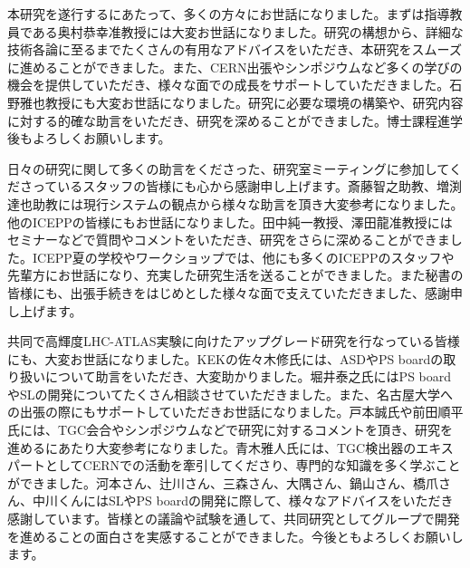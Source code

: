

本研究を遂行するにあたって、多くの方々にお世話になりました。まずは指導教員である奥村恭幸准教授には大変お世話になりました。研究の構想から、詳細な技術各論に至るまでたくさんの有用なアドバイスをいただき、本研究をスムーズに進めることができました。また、CERN出張やシンポジウムなど多くの学びの機会を提供していただき、様々な面での成長をサポートしていただきました。石野雅也教授にも大変お世話になりました。研究に必要な環境の構築や、研究内容に対する的確な助言をいただき、研究を深めることができました。博士課程進学後もよろしくお願いします。

日々の研究に関して多くの助言をくださった、研究室ミーティングに参加してくださっているスタッフの皆様にも心から感謝申し上げます。斎藤智之助教、増渕達也助教には現行システムの観点から様々な助言を頂き大変参考になりました。他のICEPPの皆様にもお世話になりました。田中純一教授、澤田龍准教授にはセミナーなどで質問やコメントをいただき、研究をさらに深めることができました。ICEPP夏の学校やワークショップでは、他にも多くのICEPPのスタッフや先輩方にお世話になり、充実した研究生活を送ることができました。また秘書の皆様にも、出張手続きをはじめとした様々な面で支えていただきました、感謝申し上げます。

共同で高輝度LHC-ATLAS実験に向けたアップグレード研究を行なっている皆様にも、大変お世話になりました。KEKの佐々木修氏には、ASDやPS boardの取り扱いについて助言をいただき、大変助かりました。堀井泰之氏にはPS boardやSLの開発についてたくさん相談させていただきました。また、名古屋大学への出張の際にもサポートしていただきお世話になりました。戸本誠氏や前田順平氏には、TGC会合やシンポジウムなどで研究に対するコメントを頂き、研究を進めるにあたり大変参考になりました。青木雅人氏には、TGC検出器のエキスパートとしてCERNでの活動を牽引してくださり、専門的な知識を多く学ぶことができました。河本さん、辻川さん、三森さん、大隅さん、鍋山さん、橋爪さん、中川くんにはSLやPS boardの開発に際して、様々なアドバイスをいただき感謝しています。皆様との議論や試験を通して、共同研究としてグループで開発を進めることの面白さを実感することができました。今後ともよろしくお願いします。

